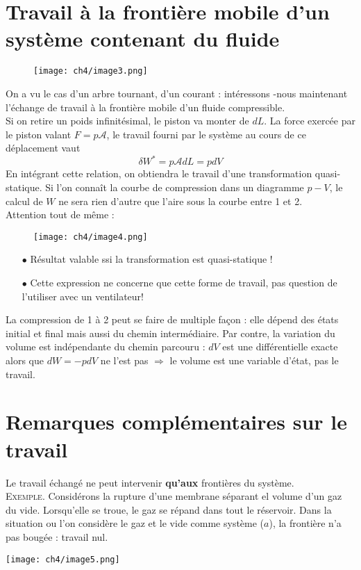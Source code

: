 \section{Travail à la frontière mobile d'un système contenant du 
fluide}
	\begin{wrapfigure}[7]{r}{4.7cm}
	\vspace{-7mm}
	\texttt{[image: ch4/image3.png]}
	\end{wrapfigure}
On a vu le cas d'un arbre tournant, d'un courant : intéressons 
-nous maintenant l'échange de travail à la frontière mobile d'un 
fluide compressible.\\
Si on retire un poids infinitésimal, le piston va monter de $dL$. 
La force exercée par le piston valant $F = p\mathcal{A}$, le 
travail fourni par le système au cours de ce déplacement vaut
\begin{equation}
\delta W^* = p\mathcal{A}dL = pdV
\end{equation}
En intégrant cette relation, on obtiendra le travail d'une 
transformation quasi-statique. Si l'on connaît la courbe de 
compression dans un diagramme $p-V$, le calcul de $W$ ne sera 
rien d'autre que l'aire sous la courbe entre 1 et 2.\\

Attention tout de même :\\
	\begin{wrapfigure}[10]{l}{4.7cm}
	\vspace{-7mm}
	\texttt{[image: ch4/image4.png]}
	\end{wrapfigure}
	\vspace{-1cm}
\begin{itemize}
\item[$\bullet$] Résultat valable ssi la transformation est 
quasi-statique !
\item[$\bullet$] Cette expression ne concerne que cette forme de
travail, pas question de l'utiliser avec un ventilateur!
\end{itemize}
La compression de 1 à 2 peut se faire de multiple façon : elle 
dépend des états initial et final mais aussi du chemin 
intermédiaire. Par contre, la variation du volume est indépendante 
du chemin parcouru : $dV$ est une différentielle exacte alors 
que $dW = -pdV$ ne l'est pas $\Longrightarrow$ le volume est 
une variable d'état, pas le travail.


\setcounter{section}{3}
\section{Remarques complémentaires sur le travail}
Le travail échangé ne peut intervenir \textbf{qu'aux} frontières 
du système.\\
\textsc{Exemple.} Considérons la rupture d'une membrane séparant 
el volume d'un gaz du vide. Lorsqu'elle se troue, le gaz se 
répand dans tout le réservoir. Dans la situation ou l'on considère 
le gaz et le vide comme système ($a$), la frontière n'a pas bougée : 
travail nul. 
\begin{center}
	\texttt{[image: ch4/image5.png]}
\end{center}


